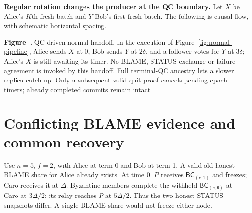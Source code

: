 \documentclass[10pt,a4paper]{article}
\newcommand{\pipelinecaption}[2]{\refstepcounter{figure}\label{#1}\par\smallskip
 {\small\textbf{Figure~\thefigure.} #2\par}\medskip}
\newcommand{\QC}{\mathsf{QC}}
\newcommand{\BC}{\mathsf{BC}}
\begin{document}
\medskip
\textbf{Regular rotation changes the producer at the QC boundary.}
Let $X$ be Alice's $K$th fresh batch and $Y$ Bob's first fresh batch. The
following is causal flow, with schematic horizontal spacing.
\begin{center}
\end{center}
\pipelinecaption{fig:normal-rotation}{QC-driven normal handoff.
In the execution of Figure~\ref{fig:normal-pipeline}, Alice sends $X$ at 0,
Bob sends $Y$ at $2\delta$, and a follower votes for $Y$ at $3\delta$;
Alice's $X$ is still awaiting its timer. No BLAME, STATUS exchange or failure
agreement is invoked by this handoff. Full terminal-QC ancestry lets a slower
replica catch up. Only a subsequent valid quit proof cancels pending epoch
timers; already completed commits remain intact.}

\clearpage
\section*{Conflicting BLAME evidence and common recovery}
Use $n=5$, $f=2$, with Alice at term 0 and Bob at term 1. A valid old honest
BLAME share for Alice already exists. At time 0, $P$ receives $\BC_{(e,1)}$
and freezes; Caro receives it at $\Delta$. Byzantine members complete the
withheld $\BC_{(e,0)}$ at Caro at $3\Delta/2$; its relay reaches $P$ at
$5\Delta/2$. Thus the two honest STATUS snapshots differ. A single BLAME
share would not freeze either node.
\end{document}
